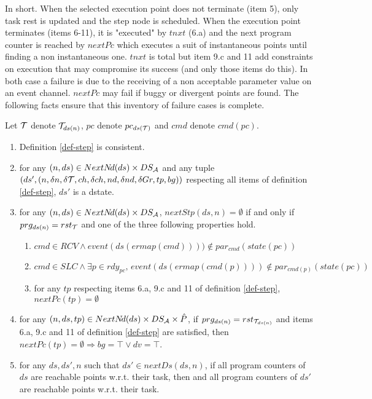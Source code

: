 \documentclass{article}
\begin{document}
In short. When the selected execution point does not terminate (item 5), only task rest is updated and the step node is scheduled. When the execution point terminates (items 6-11), it is "executed" by $tnxt$ (6.a)
and the next program counter is reached by $nextPc$ which executes a suit of instantaneous points until finding a non instantaneous one. $tnxt$ is total but item 9.c and 11 add constraints on execution that may compromise its success (and only those items do this). In both case a failure is due to the receiving of a non acceptable parameter value on an event channel. $nextPc$ may fail if buggy or divergent points are found. The following facts ensure that this inventory of failure cases is complete.
\begin{fact}\label{fact-step} Let ${\cal T}$ denote ${\cal T}_{ds(n)}$, $pc$ denote $pc_{ds({\cal T})}$ and $cmd$ denote $cmd(pc)$.
\begin{enumerate}
\item Definition \ref{def-step} is consistent.
\item for any $(n,ds)\in NextN\!d(ds)\times DS_{\cal A}$ and any tuple $(ds',(n,\delta n,\delta {\cal T},ch,\delta ch,nd,\delta nd,\delta Gr, tp,bg))$ respec\-ting all items of definition \ref{def-step}, $ds'$ is a dstate.
\item for any $(n,ds)\in NextN\!d(ds)\times DS_{\cal A}$, $nextStp(ds,n)=\emptyset$ if and only if $prg_{ds(n)}= rst_{{\cal T}}$ and one of the three following properties hold.
  \begin{enumerate}
  \item $cmd\in RCV \wedge event(ds(ermap(cmd))))\notin par_{cmd}(state(pc))$
  \item $cmd\in S\!LC \wedge \exists p\in rdy_{pc},\,event(ds(ermap(cmd(p))))\notin par_{cmd(p)}(state(pc))$
  \item for any $tp$ respecting items 6.a, 9.c and 11 of definition \ref{def-step}, $nextPc(tp)=\emptyset$
\end{enumerate}
\item for any $(n,ds,tp)\in NextN\!d(ds)\times DS_{\cal A}\times \hat P$, if $prg_{ds(n)}= rst_{{\cal T}_{ds(n)}}$ and items 6.a, 9.c and 11 of definition \ref{def-step} are satisfied, then $nextPc(tp)=\emptyset\Rightarrow bg=\top\vee dv=\top$.
\item for any $ds, ds',n$ such that $ds'\in nextDs(ds,n)$, if all program counters of $ds$ are reachable points w.r.t. their task, then  and all program counters of $ds'$ are reachable points w.r.t. their task.
\end{enumerate}
\end{fact}
\end{document}
